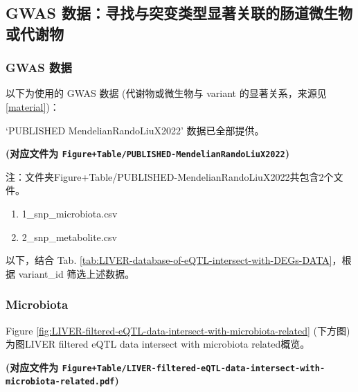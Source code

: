 \documentclass[
]{article}
\providecommand{\tightlist}{%
  \setlength{\itemsep}{0pt}\setlength{\parskip}{0pt}}
\begin{document}
\hypertarget{gwas-ux6570ux636eux5bfbux627eux4e0eux7a81ux53d8ux7c7bux578bux663eux8457ux5173ux8054ux7684ux80a0ux9053ux5faeux751fux7269ux6216ux4ee3ux8c22ux7269}{%
\subsection{GWAS 数据：寻找与突变类型显著关联的肠道微生物或代谢物}\label{gwas-ux6570ux636eux5bfbux627eux4e0eux7a81ux53d8ux7c7bux578bux663eux8457ux5173ux8054ux7684ux80a0ux9053ux5faeux751fux7269ux6216ux4ee3ux8c22ux7269}}

\hypertarget{gwas}{%
\subsubsection{GWAS 数据}\label{gwas}}

以下为使用的 GWAS 数据 (代谢物或微生物与 variant 的显著关系，来源见 \ref{material})：

`PUBLISHED MendelianRandoLiuX2022' 数据已全部提供。

\textbf{(对应文件为 \texttt{Figure+Table/PUBLISHED-MendelianRandoLiuX2022})}

\begin{center}\begin{tcolorbox}[colback=gray!10, colframe=gray!50, width=0.9\linewidth, arc=1mm, boxrule=0.5pt]注：文件夹Figure+Table/PUBLISHED-MendelianRandoLiuX2022共包含2个文件。

\begin{enumerate}\tightlist
\item 1\_snp\_microbiota.csv
\item 2\_snp\_metabolite.csv
\end{enumerate}\end{tcolorbox}
\end{center}

以下，结合 Tab. \ref{tab:LIVER-database-of-eQTL-intersect-with-DEGs-DATA}，根据 variant\_id 筛选上述数据。

\hypertarget{f-mic}{%
\subsubsection{Microbiota}\label{f-mic}}

Figure \ref{fig:LIVER-filtered-eQTL-data-intersect-with-microbiota-related} (下方图) 为图LIVER filtered eQTL data intersect with microbiota related概览。

\textbf{(对应文件为 \texttt{Figure+Table/LIVER-filtered-eQTL-data-intersect-with-microbiota-related.pdf})}
\end{document}
